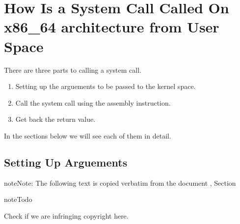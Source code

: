 \documentclass[letterpaper,10pt,english]{sphinxmanual}
\begin{document}
\chapter{How Is a System Call Called On x86\_64 architecture from User Space}
\label{\detokenize{05_calling_system_calls::doc}}\label{\detokenize{05_calling_system_calls:how-is-a-system-call-called-on-x86-64-architecture-from-user-space}}
There are three parts to calling a system call.
\begin{enumerate}
\item {} 
Setting up the arguements to be passed to the kernel space.

\item {} 
Call the system call using the  assembly instruction.

\item {} 
Get back the return value.

\end{enumerate}

In the sections below we will see each of them in detail.


\section{Setting Up Arguements}
\label{\detokenize{05_calling_system_calls:setting-up-arguements}}
\begin{sphinxadmonition}{note}{Note:}
The following text is copied verbatim from the document , Section 
\end{sphinxadmonition}

\begin{sphinxadmonition}{note}{Todo}

Check if we are infringing copyright here.
\end{sphinxadmonition}
\end{document}
